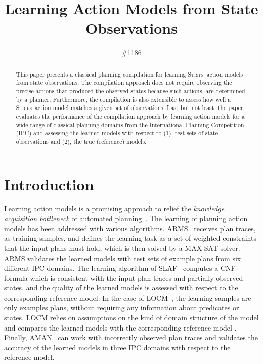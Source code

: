 \documentclass{article}
\title{Learning Action Models from State Observations}
\author{\#1186
}
\newcommand{\strips}{\textsc{Strips}}     %
\begin{document}
\maketitle

\begin{abstract}
This paper presents a classical planning compilation for learning \strips\ action models from state observations. The compilation approach does not require observing the precise actions that produced the observed states because such actions, are determined by a planner. Furthermore, the compilation is also extensible to assess how well a \strips\ action model matches a given set of observations. Last but not least, the paper evaluates the performance of the compilation approach by learning action models for a wide range of classical planning domains from the International Planning Competition (IPC) and assessing the learned models with respect to (1), test sets of state observations and (2), the true (reference) models.
\end{abstract}


\section{Introduction}

Learning action models is a promising approach to relief the {\em knowledge acquisition bottleneck} of automated planning~\cite{kambhampati:modellite:AAAI2007}. The learning of planning action models has been addressed with various algorithms. {\sc ARMS}~\cite{yang2007learning} receives plan traces, as training samples, and defines the learning task as a set of weighted constraints that the input plans must hold, which is then solved by a MAX-SAT solver. {\sc ARMS} validates the learned models with test sets of example plans from six different IPC domains. %
The learning algorithm of {\sc SLAF}~\cite{amir:alearning:JAIR08} computes a CNF formula which is consistent with the input plan traces and partially observed states, and the quality of the learned models is assessed with respect to the corresponding reference model. In the case of {\sc LOCM}~\cite{cresswell2013acquiring}, the learning samples are only examples plans, without requiring any information about predicates or states. {\sc LOCM} relies on assumptions on the kind of domain structure of the model and compares the learned models with the corresponding reference model \cite{GregoryC16}. Finally, {\sc AMAN}~\cite{zhuo2013action} can work with incorrectly observed plan traces and validates the accuracy of the learned models in three IPC domains with respect to the reference model.
\end{document}

